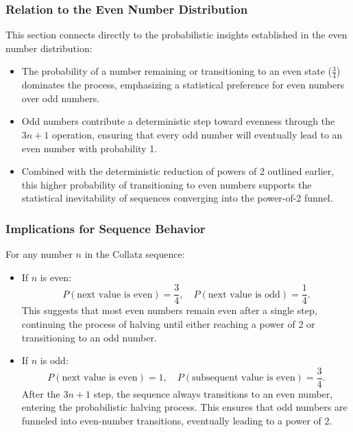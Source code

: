 \subsubsection{Relation to the Even Number Distribution}
This section connects directly to the probabilistic insights established in the even number distribution:
\begin{itemize}
    \item The probability of a number remaining or transitioning to an even state (\( \frac{3}{4} \)) dominates the process, emphasizing a statistical preference for even numbers over odd numbers.
    \item Odd numbers contribute a deterministic step toward evenness through the \( 3n + 1 \) operation, ensuring that every odd number will eventually lead to an even number with probability 1.
    \item Combined with the deterministic reduction of powers of 2 outlined earlier, this higher probability of transitioning to even numbers supports the statistical inevitability of sequences converging into the power-of-2 funnel.
\end{itemize}

\subsubsection{Implications for Sequence Behavior}
For any number \( n \) in the Collatz sequence:
\begin{itemize}
    \item If \( n \) is even:
    \[
    P(\text{next value is even}) = \frac{3}{4}, \quad P(\text{next value is odd}) = \frac{1}{4}.
    \]
    This suggests that most even numbers remain even after a single step, continuing the process of halving until either reaching a power of 2 or transitioning to an odd number.
    \item If \( n \) is odd:
    \[
    P(\text{next value is even}) = 1, \quad P(\text{subsequent value is even}) = \frac{3}{4}.
    \]
    After the \( 3n + 1 \) step, the sequence always transitions to an even number, entering the probabilistic halving process. This ensures that odd numbers are funneled into even-number transitions, eventually leading to a power of 2.
\end{itemize}

